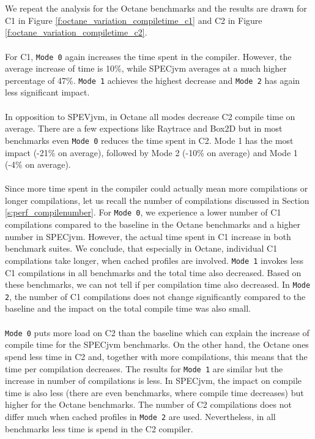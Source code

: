 \\\\
We repeat the analysis for the Octane benchmarks and the results are drawn for C1 in Figure \ref{f:octane_variation_compiletime_c1} and C2 in Figure \ref{f:octane_variation_compiletime_c2}.
\\\\
For C1, \texttt{Mode 0} again increases the time spent in the compiler. However, the average increase of time is 10\%, while SPECjvm averages at a much higher percentage of 47\%.
\texttt{Mode 1} achieves the highest decrease and \texttt{Mode 2} has again less significant impact.
\\\\
In opposition to SPEVjvm, in Octane all modes decrease C2 compile time on average. There are a few expections like Raytrace and Box2D but in most benchmarks even \texttt{Mode 0} reduces the time spent in C2. Mode 1 has the most impact (-21\% on average), followed by Mode 2 (-10\% on average) and Mode 1 (-4\% on average).
\\\\
Since more time spent in the compiler could actually mean more compilations or longer compilations, let us recall the number of compilations discussed in Section \ref{s:perf_compilenumber}. For \texttt{Mode 0}, we experience a lower number of C1 compilations compared to the baseline in the Octane benchmarks and a higher number in SPECjvm. However, the actual time spent in C1 increase in both benchmark suites. We conclude, that especially in Octane, individual C1 compilations take longer, when cached profiles are involved. \texttt{Mode 1} invokes less C1 compilations in all benchmarks and the total time also decreased. Based on these benchmarks, we can not tell if per compilation time also decreased. In \texttt{Mode 2}, the number of C1 compilations does not change significantly compared to the baseline and the impact on the total compile time was also small.
\\\\
\texttt{Mode 0} puts more load on C2 than the baseline which can explain the increase of compile time for the SPECjvm benchmarks. On the other hand, the Octane ones spend less time in C2 and, together with more compilations, this means that the time per compilation decreases. The results for \texttt{Mode 1} are similar but the increase in number of compilations is less. In SPECjvm, the impact on compile time is also less (there are even benchmarks, where compile time decreases) but higher for the Octane benchmarks. The number of C2 compilations does not differ much when cached profiles in \texttt{Mode 2} are used. Nevertheless, in all benchmarks less time is spend in the C2 compiler.
